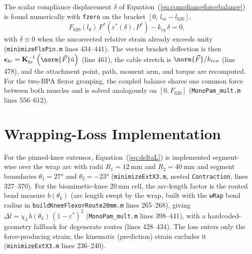 The scalar compliance displacement $\delta$ of Equation~(\ref{eq:complianceforcebalance}) is found numerically with \texttt{fzero} on the bracket $[0,\, l_{m}-l_{620}]$,
\begin{equation}
    F_{620}(l_{0})\,F^{*}\!\left(\varepsilon^{*}(\delta),P^{*}\right) - k_{eq}\,\delta = 0,
    \label{eq:app_forcebalance}
\end{equation}
with $\delta \equiv 0$ when the uncorrected relative strain already exceeds unity (\texttt{minimizeFlxPin.m} lines 434--441). The vector bracket deflection is then $\boldsymbol{\epsilon}_{br} = \mathbf{K}_{br}^{-1}\left(\norm{\vec{F}}\hat{u}\right)$ (line 461), the cable stretch is $\norm{\vec{F}}/k_{ten}$ (line 478), and the attachment point, path, moment arm, and torque are recomputed. For the two-BPA flexor grouping, the coupled balance shares one common force between both muscles and is solved analogously on $[0, F_{620}]$ (\texttt{MonoPam\_mult.m} lines 556--612).

\section{Wrapping-Loss Implementation}

For the pinned-knee extensor, Equation~(\ref{eq:deltaL}) is implemented segment-wise over the wrap arc with radii $R_1 = \qty{12}{\mm}$ and $R_2 = \qty{40}{\mm}$ and segment boundaries $\theta_{1} = \ang{27}$ and $\theta_{2} = \ang{-23}$ (\texttt{minimizeExtX3.m}, nested \texttt{Contraction}, lines 327--370). For the biomimetic-knee 20\,mm cell, the arc-length factor is the routed bend measure $b(\theta_{k})$ (arc length swept by the wrap, built with the \texttt{wRap} bend radius in \texttt{buildKneeFlexorRoute20mm.m} lines 265--268), giving $\Delta l = \chi_{3}\, b(\theta_{k})\,(1-\varepsilon^{*})^{2}$ (\texttt{MonoPam\_mult.m} lines 398--441), with a hardcoded-geometry fallback for degenerate routes (lines 428--434). The loss enters only the force-producing strain; the kinematic (prediction) strain excludes it (\texttt{minimizeExtX3.m} lines 236--240).

